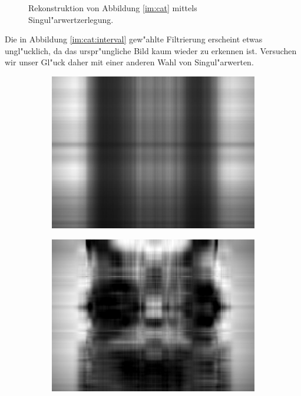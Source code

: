 \begin{figure}[h!]
\begin{subfigure}[c]{.3\textwidth}
\end{subfigure}

\caption{Rekonstruktion von Abbildung \ref{im:cat} mittels Singul"arwertzerlegung.}
\end{figure}

Die in Abbildung \ref{im:cat:interval} gew"ahlte Filtrierung erscheint etwas ungl"ucklich, da das urspr"ungliche Bild kaum wieder zu erkennen ist.
Versuchen wir unser Gl"uck daher mit einer anderen Wahl von Singul"arwerten.

\newpage

\begin{figure}[h!]
\center
\begin{subfigure}[c]{.3\textwidth}
\includegraphics[width=.9\linewidth]{images/cat1}
\end{subfigure}
\begin{subfigure}[c]{.3\textwidth}
\includegraphics[width=.9\linewidth]{images/cat5}

\end{subfigure}
\end{figure}

